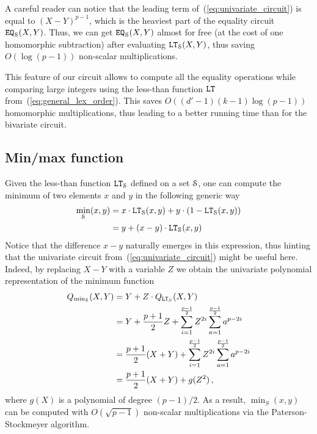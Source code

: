   \begin{remark}
    A careful reader can notice that the leading term of~(\ref{eq:univariate_circuit}) is equal to $(X-Y)^{p-1}$, which is the heaviest part of the equality circuit $\EQ_\S(X,Y)$.
    Thus, we can get $\EQ_\S(X,Y)$ almost for free (at the cost of one homomorphic subtraction) after evaluating $\LT_\S(X,Y)$, thus saving $O(\log (p-1))$ non-scalar multiplications.

    This feature of our circuit allows to compute all the equality operations while comparing large integers using the less-than function $\LT$ from~(\ref{eq:general_lex_order}).
    This saves $O((d'-1)(k-1) \log (p-1))$ homomorphic multiplications, thus leading to a better running time than for the bivariate circuit.
  \end{remark}

\subsection{Min/max function}

  Given the less-than function $\LT_\S$ defined on a set $\S$, one can compute the minimum of two elements $x$ and $y$ in the following generic way
  \begin{align*}
    \min_\S(x,y) &= x \cdot \LT_\S(x,y) + y \cdot (1 - \LT_\S(x,y)) \\
    &= y + (x-y) \cdot \LT_\S(x,y)
  \end{align*}
  Notice that the difference $x - y$ naturally emerges in this expression, thus hinting that the univariate circuit from~(\ref{eq:univariate_circuit}) might be useful here.
  Indeed, by replacing $X - Y$ with a variable $Z$ we obtain the univariate polynomial representation of the minimum function 
  \begin{align*}
    Q_{\min_\S}(X,Y) &= Y + Z \cdot Q_{\LT_S}(X,Y) \\
    & = Y + \frac{p+1}{2} Z + \sum_{i=1}^{\frac{p-1}{2}} Z^{2i} \sum_{a=1}^{\frac{p-1}{2}} a^{p-2i} \\
    & = \frac{p+1}{2} (X+Y) + \sum_{i=1}^{\frac{p-1}{2}} Z^{2i} \sum_{a=1}^{\frac{p-1}{2}} a^{p-2i} \\
    & = \frac{p+1}{2} (X+Y) + g(Z^2)\,,
  \end{align*}
  where $g(X)$ is a polynomial of degree $(p-1)/2$. 
  As a result, $\min_S(x,y)$ can be computed with $O(\sqrt{p-1})$ non-scalar multiplications via the Paterson-Stockmeyer algorithm.

